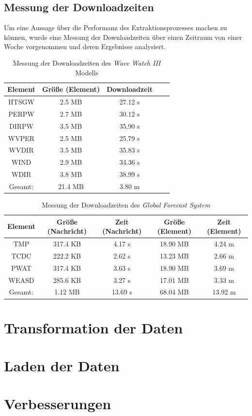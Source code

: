 \subsection{Messung der Downloadzeiten}

Um eine Aussage über die Performanz des Extraktionsprozesses machen zu
können, wurde eine Messung der Downloadzeiten über einen Zeitraum von
einer Woche vorgenommen und deren Ergebnisse analysiert.

\begin{table}[h]
  \centering
  {\sf
    \footnotesize
    \begin{longtable}{@{}ccccc}
      \toprule
      \textbf{Element} & \textbf{Größe (Element)} & \textbf{Downloadzeit}  \\
      \midrule
      HTSGW & 2.5 MB & 27.12 s \\
      PERPW & 2.7 MB & 30.12 s \\
      DIRPW & 3.5 MB & 35.90 s \\
      WVPER & 2.5 MB & 25.79 s \\
      WVDIR & 3.5 MB & 35.83 s \\
      WIND  & 2.9 MB & 34.36 s \\
      WDIR  & 3.8 MB & 38.99 s \\
      \midrule
      Gesamt: & 21.4 MB & 3.80 m \\
      \bottomrule
    \end{longtable}
  }
  \caption{Messung der Downloadzeiten des \textit{Wave Watch III} Modells}
  \label{tab:download_messung_ww3}
\end{table}

\begin{table}[h]
  \centering
  {\sf
    \footnotesize
    \begin{longtable}{@{}ccccc}
      \toprule
      \textbf{Element} & \textbf{Größe (Nachricht)} & \textbf{Zeit (Nachricht)} & \textbf{Größe (Element)} & \textbf{Zeit (Element)} \\
      \midrule
      TMP   & 317.4 KB & 4.17 s & 18.90 MB & 4.24 m \\
      TCDC  & 222.2 KB & 2.62 s & 13.23 MB & 2.66 m \\
      PWAT  & 317.4 KB & 3.63 s & 18.90 MB & 3.69 m \\
      WEASD & 285.6 KB & 3.27 s & 17.01 MB & 3.33 m \\
      \midrule
      Gesamt: & 1.12 MB  & 13.69 s & 68.04 MB & 13.92 m \\
      \bottomrule
    \end{longtable}
  }
  \caption{Messung der Downloadzeiten des \textit{Global Forecast System}}
  \label{tab:download_messung_ww3}
\end{table}


\section{Transformation der Daten}
\section{Laden der Daten}
\section{Verbesserungen}

